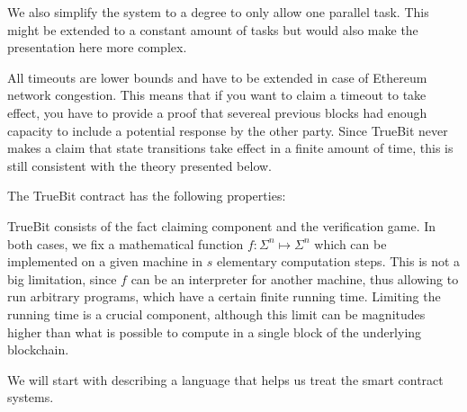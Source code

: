 \documentclass[11pt,letterpaper]{article}
\begin{document}
We also simplify the system to a degree to only allow one parallel task. This might be extended to a constant amount
of tasks but would also make the presentation here more complex.

All timeouts are lower bounds and have to be extended in case of Ethereum network congestion. This means that if you want
to claim a timeout to take effect, you have to provide a proof that severeal previous blocks had enough capacity to
include a potential response by the other party. Since TrueBit never makes a claim that state transitions take effect
in a finite amount of time, this is still consistent with the theory presented below.

The TrueBit contract has the following properties:

TrueBit consists of the fact claiming component and the verification game. In both cases, we fix a mathematical function
$f \colon \Sigma^n \mapsto \Sigma^n$ which can be implemented on a given machine in $s$ elementary computation steps.
This is not a big limitation, since $f$ can be an interpreter for another machine, thus allowing to run arbitrary programs,
which have a certain finite running time. Limiting the running time is a crucial component, although this limit can be
magnitudes higher than what is possible to compute in a single block of the underlying blockchain.

We will start with describing a language that helps us treat the smart contract systems.
\end{document}
